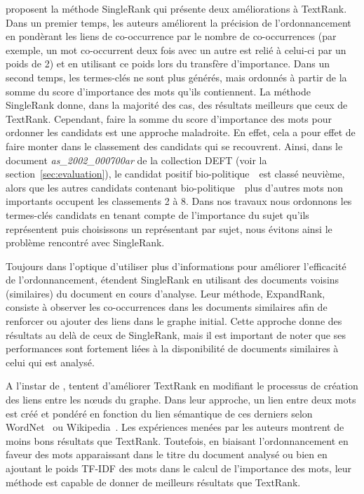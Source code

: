      proposent la méthode SingleRank qui présente
    deux améliorations à TextRank. Dans un premier temps, les auteurs améliorent
    la précision de l'ordonnancement en pondèrant les liens de co-occurrence par
    le nombre de co-occurrences (par exemple, un mot co-occurrent deux fois avec
    un autre est relié à celui-ci par un poids de 2) et en utilisant ce poids
    lors du transfère d'importance.
    Dans un second temps, les termes-clés ne sont plus générés, mais ordonnés à
    partir de la somme du score d'importance des mots qu'ils contiennent. La
    méthode SingleRank donne, dans la majorité des cas, des résultats meilleurs
    que ceux de TextRank. Cependant, faire la somme du score d'importance des
    mots pour ordonner les candidats est une approche maladroite. En effet, cela
    a pour effet de faire monter dans le classement des candidats qui se
    recouvrent. Ainsi, dans le document \textit{as\_2002\_000700ar} de la
    collection DEFT (voir la section~\ref{sec:evaluation}), le candidat positif
    \og bio-politique~\fg\ est classé neuvième, alors que les autres candidats
    contenant \og bio-politique~\fg\ plus d'autres mots non importants occupent
    les classements 2 à 8. Dans nos travaux nous ordonnons les termes-clés
    candidats en tenant compte de l'importance du sujet qu'ils représentent puis
    choisissons un représentant par sujet, nous évitons ainsi le problème
    rencontré avec SingleRank.

    Toujours dans l'optique d'utiliser plus d'informations pour améliorer
    l'efficacité de l'ordonnancement,  étendent
    SingleRank en utilisant des documents voisins (similaires) du document en
    cours d'analyse. Leur méthode, ExpandRank, consiste à observer les
    co-occurrences dans les documents similaires afin de renforcer ou ajouter
    des liens dans le graphe initial. Cette approche donne des résultats au delà
    de ceux de SingleRank, mais il est important de noter que ses performances
    sont fortement liées à la disponibilité de documents similaires à celui qui
    est analysé.

    A l'instar de ,
     tentent d'améliorer TextRank en
    modifiant le processus de création des liens entre les n\oe{}uds du graphe.
    Dans leur approche, un lien entre deux mots est créé et pondéré en fonction
    du lien sémantique de ces derniers selon WordNet~\cite{miller1995wordnet} ou
    Wikipedia~\cite{milne2008wikipediasemanticrelatedness}. Les expériences
    menées par les auteurs montrent de moins bons résultats que TextRank.
    Toutefois, en biaisant l'ordonnancement en faveur des mots apparaissant dans
    le titre du document analysé ou bien en ajoutant le poids TF-IDF des mots
    dans le calcul de l'importance des mots, leur méthode est capable de donner
    de meilleurs résultats que TextRank.

